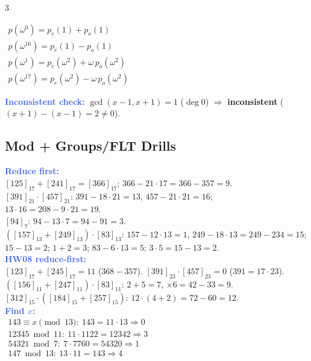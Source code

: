 \documentclass[9pt]{extarticle}
\newcommand{\hl}[1]{\textbf{\textcolor{BrickRed}{#1}}}
\newcommand{\ex}[1]{\textbf{\textcolor{RoyalBlue}{#1}}}
\begin{document}
\begin{multicols}{3}
\begin{sloppypar}
\end{sloppypar}
$\begin{array}{l}
p(\omega^0)=p_e(1)+p_o(1)\\
p(\omega^{16})=p_e(1)-p_o(1)\\
p(\omega^1)=p_e(\omega^2)+\omega\,p_o(\omega^2)\\
p(\omega^{17})=p_e(\omega^2)-\omega\,p_o(\omega^2)
\end{array}$
\begin{sloppypar}\raggedright
\ex{Inconsistent check:} $\gcd(x{-}1,x{+}1){=}1$ ($\deg0$) $\Rightarrow$ \hl{inconsistent} ($(x{+}1){-}(x{-}1){=}2{\ne}0$).
\end{sloppypar}

\subsection{Mod + Groups/FLT Drills}
\begin{sloppypar}\raggedright
\ex{Reduce first:}\\
$[125]_{17}{+}[241]_{17}{=}[366]_{17}$; $366{-}21{\cdot}17{=}366{-}357{=}9$.\\
$[391]_{21}{\cdot}[457]_{21}$: $391{-}18{\cdot}21{=}13$, $457{-}21{\cdot}21{=}16$; $13{\cdot}16{=}208{-}9{\cdot}21{=}19$.\\
$[94]_7$: $94{-}13{\cdot}7{=}94{-}91{=}3$.\\
$([157]_{13}{+}[249]_{13}){\cdot}[83]_{13}$: $157{-}12{\cdot}13{=}1$, $249{-}18{\cdot}13{=}249{-}234{=}15$; $15{-}13{=}2$; $1{+}2{=}3$; $83{-}6{\cdot}13{=}5$; $3{\cdot}5{=}15{-}13{=}2$.\\
\ex{HW08 reduce-first:}\\
$[123]_{17}{+}[245]_{17}{=}11$ ($368{-}357$). $[391]_{23}{\cdot}[457]_{23}{=}0$ ($391{=}17{\cdot}23$).\\
$([156]_{11}{+}[247]_{11}){\cdot}[83]_{11}$: $2{+}5{=}7$, ${\times}6{=}42{-}33{=}9$. $[312]_{15}{\cdot}([184]_{15}{+}[257]_{15})$: $12{\cdot}(4{+}2){=}72{-}60{=}12$.\\
\ex{Find $x$:}\\
$\begin{array}{l}
143\equiv x\pmod{13}:\ 143{=}11{\cdot}13\Rightarrow0\\
12345\bmod11:\ 11{\cdot}1122{=}12342\Rightarrow3\\
54321\bmod7:\ 7{\cdot}7760{=}54320\Rightarrow1\\
147\bmod13:\ 13{\cdot}11{=}143\Rightarrow4
\end{array}$\\

\end{sloppypar}
\end{multicols}
\end{document}
